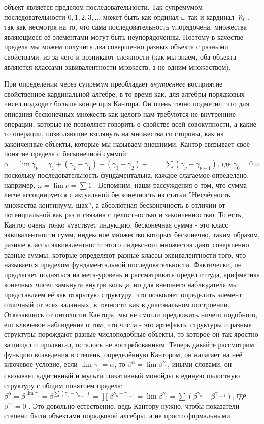 \documentclass[12pt]{article}
\begin{document}
объект является пределом последовательности. Так супремумом последовательности $0, 1, 2, 3, \dots$ может быть как ординал $\omega$ так и кардинал $\aleph_0$, так как несмотря на то, что сама последовательность упорядочена, множества являющиеся её элементами могут быть неупорядоченны. Поэтому в качестве предела мы можем получить два совершенно разных объекта с разными свойствами, из-за чего и возникают сложности (как мы знаем, оба объекта являются классами эквивалентности множеств, а не одним множеством). 

При определении через супремум преобладает {\it внутреннее} восприятие свойственное кардинальной алгебре, в то время как, для алгебры порядковых чисел подходит больше концепция Кантора. Он очень точно подметил, что для описания бесконечных множеств как целого нам требуются не внутренние операции, которые не позволяют говорить о свойстве всей совокупности, а какие-то операции, позволяющие взглянуть на множества со стороны, как на законченные объекты, которые мы называем внешними. Кантор связывает своё понятие предела с бесконечной суммой: $\alpha = \lim \gamma_{\nu} = \gamma_1 + (\gamma_2 - \gamma_1) + (\gamma_3 - \gamma_2) + \dots = \sum (\gamma_{\nu} - \gamma_{\nu - 1})$, где $\gamma_0 = 0$ и поскольку последовательность фундаментальна, каждое слагаемое определено, например, $\omega = \lim \nu = \sum 1$ \cite{cantor-limit}. Вспомним, наши рассуждения о том, что сумма легче ассоциируется с актуальной бесконечность из статьи ''Несчётность множества континуум, шах'', а абсолютная бесконечность в отличии от потенциальной как раз и связана с целостностью и законченностью. То есть, Кантор очень тонко чувствует индукцию, бесконечная сумма - это класс эквивалентности сумм, индексное множество которых бесконечно, таким образом, разные классы эквивалентности этого индексного множества дают совершенно разные суммы, которые определяют разные классы эквивалентности того, что называется пределом фундаментальной последовательности. Фактически, он предлагает подняться на мета-уровень и рассматривать предел оттуда, арифметика конечных чисел замкнута внутри кольца, но для внешнего наблюдателя мы представляем её как открытую структуру, что позволяет определить элемент отличный от всех заданных, в точности как в диагональном построении. Отказавшись от онтологии Кантора, мы не смогли предложить ничего подобного, его ключевое наблюдение о том, что числа - это артефакты структуры и разные структуры порождают разные числоподобные объекты, то которое он так яростно защищал и продвигал, осталось не востребованным. Теперь давайте рассмотрим функцию возведения в степень, определённую Кантором, он налагает на неё ключевое условие, если $\lim \gamma_{\nu} = \alpha$, то $\beta^{\alpha} = \lim \beta^{\gamma_{\nu}}$, иными словами, он связывает аддитивный и мультипликативный монойды в единую целостную структуру с общим понятием предела: $\beta^{\alpha} = \beta^{\lim \gamma_{\nu}} = \beta^{\sum (\gamma_{\nu} - \gamma_{\nu - 1})} = \prod \beta^{\gamma_{\nu} - \gamma_{\nu - 1}} = \lim \beta^{\gamma_{\nu}} = \sum (\beta^{\gamma_{\nu}} - \beta^{\gamma_{\nu - 1}})$, где $\beta^{\gamma_0} = 0$ \cite{cantor-power}. Это довольно естественно, ведь Кантору нужно, чтобы показатели степени были объектами порядковой алгебры, а не просто формальными 
\end{document}
